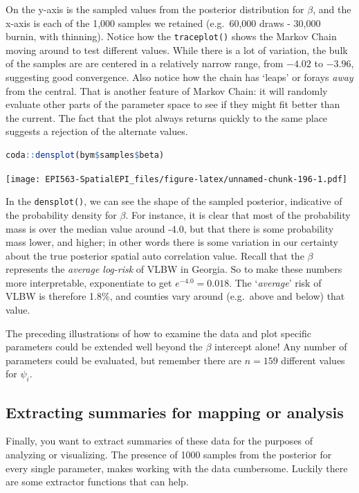 \documentclass[
]{book}
\newcommand{\passthrough}[1]{#1}
\begin{document}
On the y-axis is the sampled values from the posterior distribution for \(\beta\), and the x-axis is each of the 1,000 samples we retained (e.g.~60,000 draws - 30,000 burnin, with thinning). Notice how the \passthrough{\lstinline!traceplot()!} shows the Markov Chain moving around to test different values. While there is a lot of variation, the bulk of the samples are are centered in a relatively narrow range, from \(-4.02\) to \(-3.96\), suggesting good convergence. Also notice how the chain has `leaps' or forays \emph{away} from the central. That is another feature of Markov Chain: it will randomly evaluate other parts of the parameter space to see if they might fit better than the current. The fact that the plot always returns quickly to the same place suggests a rejection of the alternate values.

\begin{lstlisting}[language=R]
coda::densplot(bym$samples$beta)
\end{lstlisting}

\texttt{[image: EPI563-SpatialEPI\_files/figure-latex/unnamed-chunk-196-1.pdf]}

In the \passthrough{\lstinline!densplot()!}, we can see the shape of the sampled posterior, indicative of the probability density for \(\beta\). For instance, it is clear that most of the probability mass is over the median value around -4.0, but that there is some probability mass lower, and higher; in other words there is some variation in our certainty about the true posterior spatial auto correlation value. Recall that the \(\beta\) represents the \emph{average log-risk} of VLBW in Georgia. So to make these numbers more interpretable, exponentiate to get \(e^{-4.0} = 0.018\). The `\emph{average}' risk of VLBW is therefore 1.8\%, and counties vary around (e.g.~above and below) that value.

The preceding illustrations of how to examine the data and plot specific parameters could be extended well beyond the \(\beta\) intercept alone! Any number of parameters could be evaluated, but remember there are \(n=159\) different values for \(\psi_i\).

\hypertarget{extracting-summaries-for-mapping-or-analysis}{%
\subsection{Extracting summaries for mapping or analysis}\label{extracting-summaries-for-mapping-or-analysis}}

Finally, you want to extract summaries of these data for the purposes of analyzing or visualizing. The presence of 1000 samples from the posterior for every single parameter, makes working with the data cumbersome. Luckily there are some extractor functions that can help.
\end{document}
